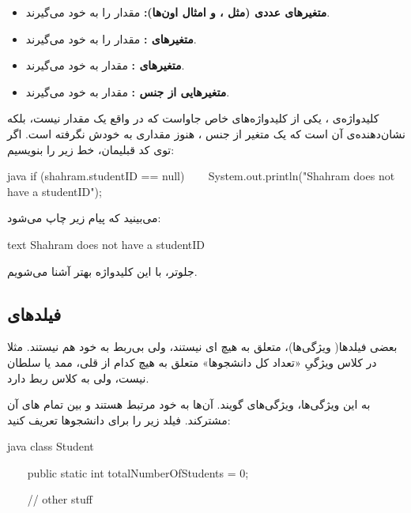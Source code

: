 \begin{itemize}
\tightlist
\item
  \textbf{متغیرهای عددی (مثل  ،  و
  امثال اون‌ها):} مقدار  را به خود می‌گیرند.
\item
  \textbf{متغیرهای  :} مقدار
   را به خود می‌گیرند.
\item
  \textbf{متغیرهای  :} مقدار  به
  خود می‌گیرند.
\item
  \textbf{متغیرهایی از جنس  :} مقدار
   به خود می‌گیرند.
\end{itemize}

کلیدواژه‌ی  ، یکی از کلیدواژه‌های خاص جاواست که در واقع
یک مقدار نیست، بلکه نشان‌دهنده‌ی آن است که یک متغیر از جنس
 ، هنوز مقداری به خودش نگرفته است. اگر توی کد
قبلیمان، خط زیر را بنویسیم:

\begin{codebox}{java}
if (shahram.studentID == null) {  
    System.out.println("Shahram does not have a studentID");  
}
\end{codebox}

می‌بینید که پیام زیر چاپ می‌شود:

\begin{codebox}{text}
Shahram does not have a studentID
\end{codebox}

جلوتر، با این کلید‌واژه بهتر آشنا می‌شویم.

\subsection{فیلدهای }

بعضی فیلدها( ویژگی‌ها)، متعلق به هیچ  ای نیستند، ولی بی‌ربط به
خود  هم نیستند. مثلا در کلاس 
ویژگیِ «تعداد کل دانشجوها» متعلق به هیچ کدام از قلی، ممد یا سلطان نیست،
ولی به کلاس  ربط دارد.

به این ویژگی‌ها، ویژگی‌های  گویند. آن‌ها به خود
 مرتبط هستند و بین تمام  های آن 
مشترکند. فیلد زیر را برای دانشجوها تعریف کنید:

\begin{codebox}{java}
class Student {
    public static int totalNumberOfStudents = 0;

    // other stuff

}
\end{codebox}

